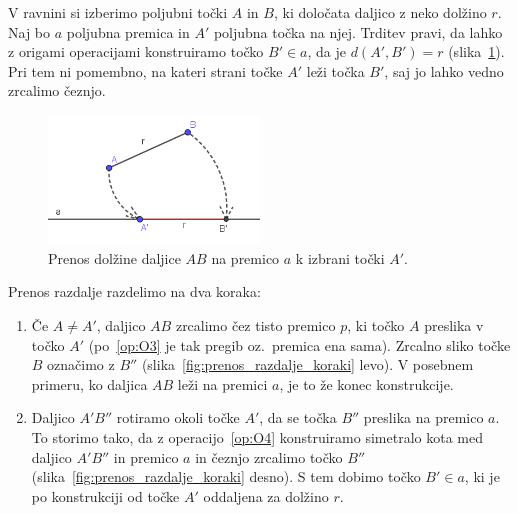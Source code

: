 \begin{dokaz}
    V ravnini si izberimo poljubni točki $A$ in $B$, ki določata daljico z neko dolžino $r$. Naj bo $a$ poljubna premica in $A'$ poljubna točka na njej. Trditev pravi, da lahko z origami operacijami konstruiramo točko $B' \in a$, da je $d(A', B') =r$ (slika~\ref{fig:prenos_razdalje_konec}). Pri tem ni pomembno, na kateri strani točke $A'$ leži točka $B'$, saj jo lahko vedno zrcalimo čeznjo.

    \begin{figure}[h]
        \centering
        \includegraphics[width=0.5\textwidth]{images/zrcaljenje_konec.png}
        \caption[Prenašanje razdalj z origamijem]{Prenos dolžine daljice $AB$ na premico $a$ k izbrani točki $A'$.}
        \label{fig:prenos_razdalje_konec}
    \end{figure}
    
    Prenos razdalje razdelimo na dva koraka:
    \begin{enumerate}
        \item Če $A \neq A'$, daljico $AB$ zrcalimo čez tisto premico $p$, ki točko $A$ preslika v točko $A'$ (po~\ref{op:O3} je tak pregib oz.\ premica ena sama). Zrcalno sliko točke $B$ označimo z $B''$ (slika~\ref{fig:prenos_razdalje_koraki} levo). V posebnem primeru, ko daljica $AB$ leži na premici $a$, je to že konec konstrukcije. 
        \item Daljico $A'B''$ rotiramo okoli točke $A'$, da se točka $B''$ preslika na premico $a$. To storimo tako, da z operacijo~\ref{op:O4} konstruiramo simetralo kota med daljico $A'B''$ in premico $a$ in čeznjo zrcalimo točko $B''$ (slika~\ref{fig:prenos_razdalje_koraki} desno). S tem dobimo točko $B' \in a$, ki je po konstrukciji od točke $A'$ oddaljena za dolžino $r$.
    \end{enumerate}


\end{dokaz}
